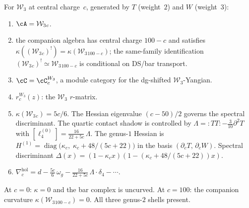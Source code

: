 \begin{computation}
\label{comp:w3-holographic-datum}
For $\mathcal W_3$ at central charge~$c$, generated by $T$
(weight~$2$) and $W$ (weight~$3$):
\begin{enumerate}[label=\textup{(\roman*)}]
\item $\cA = \mathcal W_3{}_c$.
\item the companion algebra has central charge $100-c$ and satisfies
 $\kappa((\mathcal W_3{}_c)^!)=\kappa(\mathcal W_3{}_{100-c})$;
 the same-family identification
 $(\mathcal W_3{}_c)^!\simeq\mathcal W_3{}_{100-c}$ is conditional
 on DS/bar transport.
\item $\cC = \cC_c^{W_3}$, a module category for the dg-shifted
 $\mathcal W_3$-Yangian.
\item $r_c^{W_3}(z)$: the $\mathcal W_3$ $r$-matrix.
\item $\kappa(\mathcal W_3{}_c) = 5c/6$.
 The Hessian eigenvalue $(c-50)/2$ governs the spectral discriminant.
 The quartic contact shadow is controlled by
 $\Lambda = {:}TT{:} - \tfrac{3}{10}\partial^2 T$
 with $[\ell_4^{(0)}] = \frac{16}{22+5c}\,\Lambda$.
 The genus-$1$ Hessian is
 $H^{(1)} = \operatorname{diag}\bigl(
 \kappa_c,\;\kappa_c + 48/(5c+22)\bigr)$
 in the basis $(\partial_c T,\,\partial_c W)$.
 Spectral discriminant
 $\Delta(x) = (1-\kappa_c x)(1-(\kappa_c+48/(5c+22))x)$.
\item $\nabla^{\mathrm{hol}}_c =
 d - \frac{5c}{6}\,\omega_g
 - \frac{16}{22+5c}\,\Lambda\cdot\delta_4 - \cdots$.
\end{enumerate}
At $c=0$: $\kappa=0$ and the bar complex is uncurved.
At $c=100$: the companion curvature $\kappa(\mathcal W_3{}_{100-c})=0$.
All three genus-$2$ shells present.
\end{computation}

